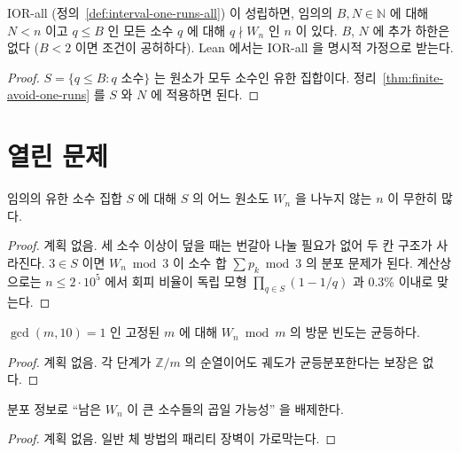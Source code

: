 \begin{theorem}
  \label{thm:avoid-small-primes}
  \leanok
  IOR-all (정의~\ref{def:interval-one-runs-all}) 이 성립하면, 임의의 \(B, N \in \mathbb{N}\) 에 대해
  \(N < n\) 이고 \(q \le B\) 인 모든 소수 \(q\) 에 대해 \(q \nmid W_n\) 인 \(n\) 이 있다.
  \(B\), \(N\) 에 추가 하한은 없다 (\(B < 2\) 이면 조건이 공허하다). Lean 에서는 IOR-all 을 명시적 가정으로 받는다.
\end{theorem}
\begin{proof}
  \leanok
  \(S = \{q \le B : q \text{ 소수}\}\) 는 원소가 모두 소수인 유한 집합이다.
  정리~\ref{thm:finite-avoid-one-runs} 를 \(S\) 와 \(N\) 에 적용하면 된다.
\end{proof}

\section{열린 문제}

\begin{proposition}[Q1, \(|S| \ge 3\)]
  \label{prop:Q1-general}
  \notready
  임의의 유한 소수 집합 \(S\) 에 대해 \(S\) 의 어느 원소도 \(W_n\) 을 나누지 않는 \(n\) 이 무한히 많다.
\end{proposition}
\begin{proof}
  계획 없음. 세 소수 이상이 덮을 때는 번갈아 나눌 필요가 없어 두 칸 구조가 사라진다.
  \(3 \in S\) 이면 \(W_n \bmod 3\) 이 소수 합 \(\sum p_k \bmod 3\) 의 분포 문제가 된다.
  계산상으로는 \(n \le 2 \cdot 10^5\) 에서 회피 비율이 독립 모형 \(\prod_{q \in S}(1 - 1/q)\) 과 0.3\% 이내로 맞는다.
\end{proof}

\begin{proposition}
  \label{prop:Q2}
  \notready
  \(\gcd(m, 10) = 1\) 인 고정된 \(m\) 에 대해 \(W_n \bmod m\) 의 방문 빈도는 균등하다.
\end{proposition}
\begin{proof}
  계획 없음. 각 단계가 \(\mathbb{Z}/m\) 의 순열이어도 궤도가 균등분포한다는 보장은 없다.
\end{proof}

\begin{proposition}[Q4, 큰 소인수의 곱 배제]
  \label{prop:Q4}
  \notready
  분포 정보로 ``남은 \(W_n\) 이 큰 소수들의 곱일 가능성'' 을 배제한다.
\end{proposition}
\begin{proof}
  계획 없음. 일반 체 방법의 패리티 장벽이 가로막는다.
\end{proof}

